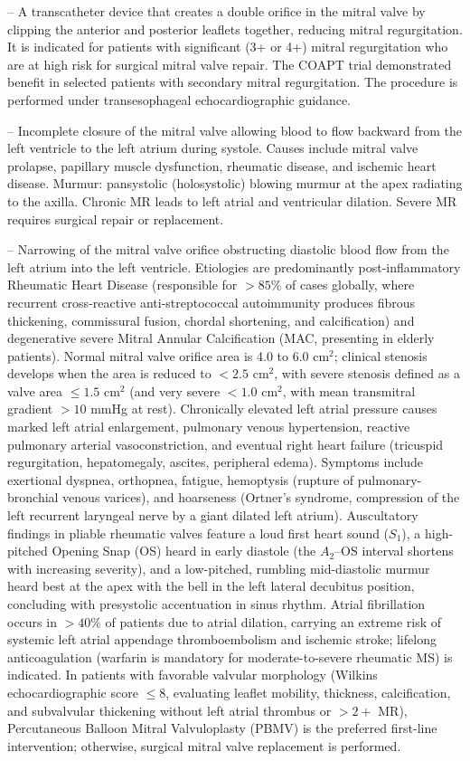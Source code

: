 -- A transcatheter device that creates a double orifice in the mitral valve by clipping the anterior and posterior leaflets together, reducing mitral regurgitation. It is indicated for patients with significant (3+ or 4+) mitral regurgitation who are at high risk for surgical mitral valve repair. The COAPT trial demonstrated benefit in selected patients with secondary mitral regurgitation. The procedure is performed under transesophageal echocardiographic guidance.

-- Incomplete closure of the mitral valve allowing blood to flow backward from the left ventricle to the left atrium during systole. Causes include mitral valve prolapse, papillary muscle dysfunction, rheumatic disease, and ischemic heart disease. Murmur: pansystolic (holosystolic) blowing murmur at the apex radiating to the axilla. Chronic MR leads to left atrial and ventricular dilation. Severe MR requires surgical repair or replacement.

-- Narrowing of the mitral valve orifice obstructing diastolic blood flow from the left atrium into the left ventricle. Etiologies are predominantly post-inflammatory Rheumatic Heart Disease (responsible for $>85\%$ of cases globally, where recurrent cross-reactive anti-streptococcal autoimmunity produces fibrous thickening, commissural fusion, chordal shortening, and calcification) and degenerative severe Mitral Annular Calcification (MAC, presenting in elderly patients). Normal mitral valve orifice area is 4.0 to 6.0 cm$^2$; clinical stenosis develops when the area is reduced to $<2.5$ cm$^2$, with severe stenosis defined as a valve area $\le 1.5$ cm$^2$ (and very severe $<1.0$ cm$^2$, with mean transmitral gradient $>10$ mmHg at rest). Chronically elevated left atrial pressure causes marked left atrial enlargement, pulmonary venous hypertension, reactive pulmonary arterial vasoconstriction, and eventual right heart failure (tricuspid regurgitation, hepatomegaly, ascites, peripheral edema). Symptoms include exertional dyspnea, orthopnea, fatigue, hemoptysis (rupture of pulmonary-bronchial venous varices), and hoarseness (Ortner's syndrome, compression of the left recurrent laryngeal nerve by a giant dilated left atrium). Auscultatory findings in pliable rheumatic valves feature a loud first heart sound ($S_1$), a high-pitched Opening Snap (OS) heard in early diastole (the $A_2\text{--OS}$ interval shortens with increasing severity), and a low-pitched, rumbling mid-diastolic murmur heard best at the apex with the bell in the left lateral decubitus position, concluding with presystolic accentuation in sinus rhythm. Atrial fibrillation occurs in $>40\%$ of patients due to atrial dilation, carrying an extreme risk of systemic left atrial appendage thromboembolism and ischemic stroke; lifelong anticoagulation (warfarin is mandatory for moderate-to-severe rheumatic MS) is indicated. In patients with favorable valvular morphology (Wilkins echocardiographic score $\le 8$, evaluating leaflet mobility, thickness, calcification, and subvalvular thickening without left atrial thrombus or $>2+$ MR), Percutaneous Balloon Mitral Valvuloplasty (PBMV) is the preferred first-line intervention; otherwise, surgical mitral valve replacement is performed.

